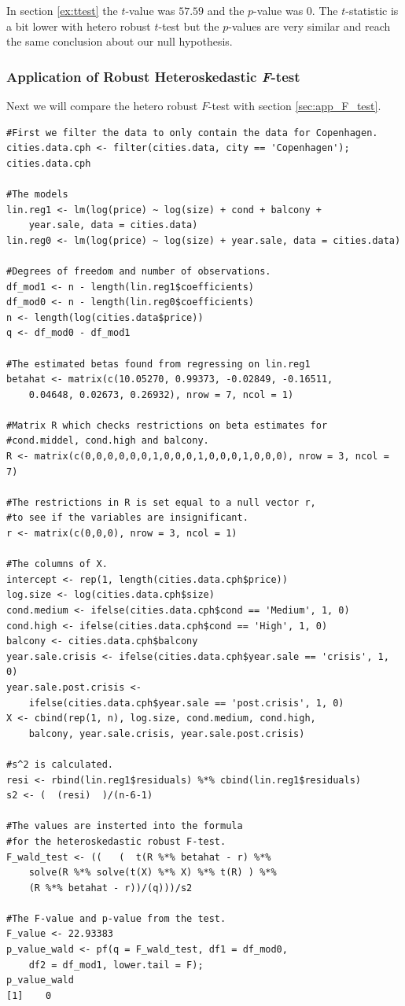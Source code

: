 In section \ref{ex:ttest} the $t$-value was $57.59$ and the $p$-value was $0$. 
The $t$-statistic is a bit lower with hetero robust $t$-test but the $p$-values are very similar and reach the same conclusion about our null hypothesis. 

\subsubsection{Application of Robust Heteroskedastic \textit{F}-test}
Next we will compare the hetero robust $F$-test with section \ref{sec:app_F_test}. 
\begin{lstlisting}
#First we filter the data to only contain the data for Copenhagen. 
cities.data.cph <- filter(cities.data, city == 'Copenhagen'); cities.data.cph

#The models
lin.reg1 <- lm(log(price) ~ log(size) + cond + balcony + 
    year.sale, data = cities.data)
lin.reg0 <- lm(log(price) ~ log(size) + year.sale, data = cities.data)

#Degrees of freedom and number of observations. 
df_mod1 <- n - length(lin.reg1$coefficients)
df_mod0 <- n - length(lin.reg0$coefficients)
n <- length(log(cities.data$price))
q <- df_mod0 - df_mod1

#The estimated betas found from regressing on lin.reg1
betahat <- matrix(c(10.05270, 0.99373, -0.02849, -0.16511,
    0.04648, 0.02673, 0.26932), nrow = 7, ncol = 1)

#Matrix R which checks restrictions on beta estimates for 
#cond.middel, cond.high and balcony. 
R <- matrix(c(0,0,0,0,0,0,1,0,0,0,1,0,0,0,1,0,0,0), nrow = 3, ncol = 7)

#The restrictions in R is set equal to a null vector r, 
#to see if the variables are insignificant. 
r <- matrix(c(0,0,0), nrow = 3, ncol = 1)

#The columns of X. 
intercept <- rep(1, length(cities.data.cph$price))
log.size <- log(cities.data.cph$size)
cond.medium <- ifelse(cities.data.cph$cond == 'Medium', 1, 0)
cond.high <- ifelse(cities.data.cph$cond == 'High', 1, 0)
balcony <- cities.data.cph$balcony
year.sale.crisis <- ifelse(cities.data.cph$year.sale == 'crisis', 1, 0)
year.sale.post.crisis <-
    ifelse(cities.data.cph$year.sale == 'post.crisis', 1, 0)
X <- cbind(rep(1, n), log.size, cond.medium, cond.high, 
    balcony, year.sale.crisis, year.sale.post.crisis)

#s^2 is calculated. 
resi <- rbind(lin.reg1$residuals) %*% cbind(lin.reg1$residuals)
s2 <- (  (resi)  )/(n-6-1)

#The values are insterted into the formula
#for the heteroskedastic robust F-test. 
F_wald_test <- ((   (  t(R %*% betahat - r) %*% 
    solve(R %*% solve(t(X) %*% X) %*% t(R) ) %*% 
    (R %*% betahat - r))/(q)))/s2

#The F-value and p-value from the test. 
F_value <- 22.93383
p_value_wald <- pf(q = F_wald_test, df1 = df_mod0, 
    df2 = df_mod1, lower.tail = F); 
p_value_wald
[1]    0
\end{lstlisting}

